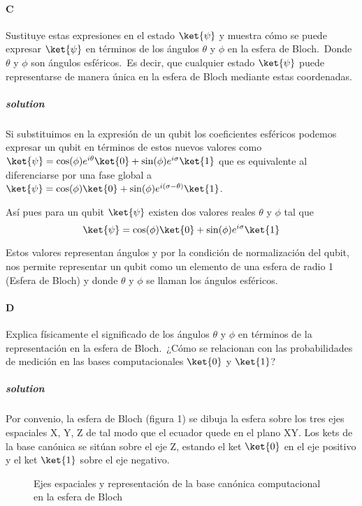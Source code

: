 \paragraph{C} Sustituye estas expresiones en el estado $\ket{\psi}$ y muestra cómo se puede expresar $\ket{\psi}$ en términos de los ángulos $\theta$ y $\phi$ en la esfera de Bloch.\ Donde $\theta$ y $\phi$ son ángulos esféricos.\ Es decir, que cualquier estado $\ket{\psi}$ puede representarse de manera única en la esfera de Bloch mediante estas coordenadas.

\subparagraph{solution}
	Si substituimos en la expresión de un qubit los coeficientes esféricos podemos expresar un qubit en términos de estos nuevos valores como $\ket{\psi}=\cos(\phi)e^{i\theta}\ket{0}+\sin(\phi)e^{i\sigma}\ket{1}$ que es equivalente al diferenciarse por una fase global a $\ket{\psi}=\cos(\phi)\ket{0}+\sin(\phi)e^{i(\sigma-\theta)}\ket{1}$.

	Así pues para un qubit $\ket{\psi}$ existen dos valores reales $\theta$ y $\phi$ tal que
	\begin{equation*}
		\ket{\psi}=\cos(\phi)\ket{0}+\sin(\phi)e^{i\sigma}\ket{1}
	\end{equation*}

	Estos valores representan ángulos y por la condición de normalización del qubit, nos permite representar un qubit como un elemento de una esfera de radio 1 (Esfera de Bloch) y donde $\theta$ y $\phi$ se llaman los ángulos esféricos.


\paragraph{D} Explica físicamente el significado de los ángulos $\theta$ y $\phi$ en términos de la representación en la esfera de Bloch.\ ¿Cómo se relacionan con las probabilidades de medición en las bases computacionales $\ket{0}$ y $\ket{1}$?

\subparagraph{solution}
	Por convenio, la esfera de Bloch (figura 1) se dibuja la esfera sobre los tres ejes espaciales X, Y, Z de tal modo que el ecuador quede en el plano XY.
	Los kets de la base canónica se sitúan sobre el eje Z, estando el ket $\ket{0}$ en el eje positivo y el ket $\ket{1}$ sobre el eje negativo.
	\begin{figure}[h]
		\centering
		\caption{Ejes espaciales y representación de la base canónica computacional en la esfera de Bloch}
	\end{figure}


